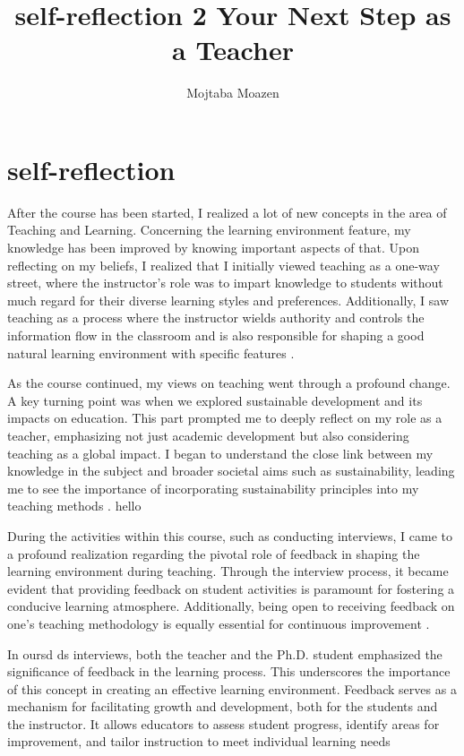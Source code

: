 \documentclass[12pt,a4paper]{article}
\title{self-reflection 2 Your Next Step as a Teacher}
\author{Mojtaba Moazen}
\begin{document}
\maketitle
\section{self-reflection}
After the course has been started, I realized a lot of new concepts in the area of Teaching and Learning. Concerning the learning environment feature, my knowledge has been improved by knowing important aspects of that. Upon reflecting on my beliefs, I realized that I initially viewed teaching as a one-way street, where the instructor's role was to impart knowledge to students without much regard for their diverse learning styles and preferences. Additionally, I saw teaching as a process where the instructor wields authority and controls the information flow in the classroom and is also responsible for shaping a good natural learning environment with specific features \cite{ain2011best}. 

As the course continued, my views on teaching went through a profound change. A key turning point was when we explored sustainable development and its impacts on education. This part prompted me to deeply reflect on my role as a teacher, emphasizing not just academic development but also considering teaching as a global impact. I began to understand the close link between my knowledge in the subject and broader societal aims such as sustainability, leading me to see the importance of incorporating sustainability principles into my teaching methods \cite{wiek2011key}.
hello

During the activities within this course, such as conducting interviews, I came to a profound realization regarding the pivotal role of feedback in shaping the learning environment during teaching. Through the interview process, it became evident that providing feedback on student activities is paramount for fostering a conducive learning atmosphere. Additionally, being open to receiving feedback on one's teaching methodology is equally essential for continuous improvement \cite{timperley2007power}.

In oursd ds  interviews, both the teacher and the Ph.D. student emphasized the significance of feedback in the learning process. This underscores the importance of this concept in creating an effective learning environment. Feedback serves as a mechanism for facilitating growth and development, both for the students and the instructor. It allows educators to assess student progress, identify areas for improvement, and tailor instruction to meet individual learning needs
\end{document}

